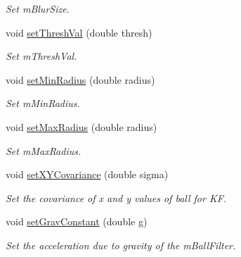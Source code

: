 \begin{DoxyCompactItemize}
\begin{DoxyCompactList}\small\item\em Set m\+Blur\+Size. \end{DoxyCompactList}\item 
void \hyperlink{classKFBallTracker_a22cf9bcd219f0d1c94cc140da8a5334f}{set\+Thresh\+Val} (double thresh)\hypertarget{classKFBallTracker_a22cf9bcd219f0d1c94cc140da8a5334f}{}\label{classKFBallTracker_a22cf9bcd219f0d1c94cc140da8a5334f}

\begin{DoxyCompactList}\small\item\em Set m\+Thresh\+Val. \end{DoxyCompactList}\item 
void \hyperlink{classKFBallTracker_a115216f4368f052b10c4b09e57bcf18f}{set\+Min\+Radius} (double radius)\hypertarget{classKFBallTracker_a115216f4368f052b10c4b09e57bcf18f}{}\label{classKFBallTracker_a115216f4368f052b10c4b09e57bcf18f}

\begin{DoxyCompactList}\small\item\em Set m\+Min\+Radius. \end{DoxyCompactList}\item 
void \hyperlink{classKFBallTracker_a07779bbccfb84888cf42138c4ae05de5}{set\+Max\+Radius} (double radius)\hypertarget{classKFBallTracker_a07779bbccfb84888cf42138c4ae05de5}{}\label{classKFBallTracker_a07779bbccfb84888cf42138c4ae05de5}

\begin{DoxyCompactList}\small\item\em Set m\+Max\+Radius. \end{DoxyCompactList}\item 
void \hyperlink{classKFBallTracker_aa71931e508ef360436e2ef592d663b6e}{set\+X\+Y\+Covariance} (double sigma)\hypertarget{classKFBallTracker_aa71931e508ef360436e2ef592d663b6e}{}\label{classKFBallTracker_aa71931e508ef360436e2ef592d663b6e}

\begin{DoxyCompactList}\small\item\em Set the covariance of x and y values of ball for KF. \end{DoxyCompactList}\item 
void \hyperlink{classKFBallTracker_ae4f26105c8f6c434c3de007cf64cf5aa}{set\+Grav\+Constant} (double g)\hypertarget{classKFBallTracker_ae4f26105c8f6c434c3de007cf64cf5aa}{}\label{classKFBallTracker_ae4f26105c8f6c434c3de007cf64cf5aa}

\begin{DoxyCompactList}\small\item\em Set the acceleration due to gravity of the m\+Ball\+Filter. \end{DoxyCompactList}\end{DoxyCompactItemize}
